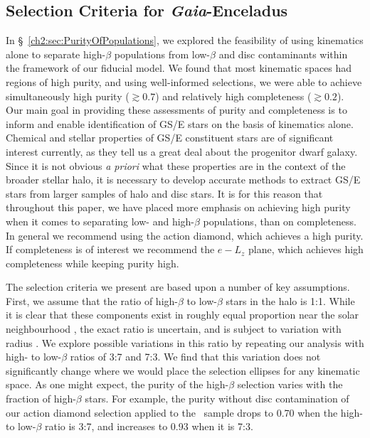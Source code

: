\subsection{Selection Criteria for \textit{Gaia}-Enceladus}

In \S~\ref{ch2:sec:PurityOfPopulations}, we explored the feasibility of using kinematics alone to separate high-$\beta$ populations from low-$\beta$ and disc contaminants within the framework of our fiducial model. We found that most kinematic spaces had regions of high purity, and using well-informed selections, we were able to achieve simultaneously high purity ($\gtrsim 0.7$) and relatively high completeness ($\gtrsim 0.2$). Our main goal in providing these assessments of purity and completeness is to inform and enable identification of GS/E stars on the basis of kinematics alone. Chemical and stellar properties of GS/E constituent stars are of significant interest currently, as they tell us a great deal about the progenitor dwarf galaxy. Since it is not obvious \textit{a priori} what these properties are in the context of the broader stellar halo, it is necessary to develop accurate methods to extract GS/E stars from larger samples of halo and disc stars. It is for this reason that throughout this paper, we have placed more emphasis on achieving high purity when it comes to separating low- and high-$\beta$ populations, than on completeness. In general we recommend using the action diamond, which achieves a high purity. If completeness is of interest we recommend the $e-L_{z}$ plane, which achieves high completeness while keeping purity high.

The selection criteria we present are based upon a number of key assumptions. First, we assume that the ratio of high-$\beta$ to low-$\beta$ stars in the halo is 1:1. While it is clear that these components exist in roughly equal proportion near the solar neighbourhood \parencite{belokurov18,lancaster19,iorio21}, the exact ratio is uncertain, and is subject to variation with radius \parencite{iorio21}. We explore possible variations in this ratio by repeating our analysis with high- to low-$\beta$ ratios of 3:7 and 7:3. We find that this variation does not significantly change where we would place the selection ellipses for any kinematic space. As one might expect, the purity of the high-$\beta$ selection varies with the fraction of high-$\beta$ stars. For example, the purity without disc contamination of our action diamond selection applied to the \survey\ sample drops to 0.70 when the high- to low-$\beta$ ratio is 3:7, and increases to 0.93 when it is 7:3.


